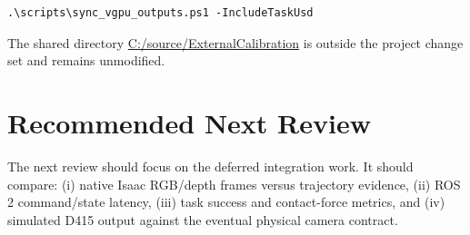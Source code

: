 \documentclass[11pt,a4paper]{article}
\begin{document}
\begin{verbatim}
.\scripts\sync_vgpu_outputs.ps1 -IncludeTaskUsd
\end{verbatim}

The shared directory \url{C:/source/ExternalCalibration} is outside the project
change set and remains unmodified.

\section{Recommended Next Review}

The next review should focus on the deferred integration work. It should compare:
(i) native Isaac RGB/depth frames versus trajectory evidence, (ii) ROS 2 command/state
latency, (iii) task success and contact-force metrics, and (iv) simulated D415 output
against the eventual physical camera contract.
\end{document}
